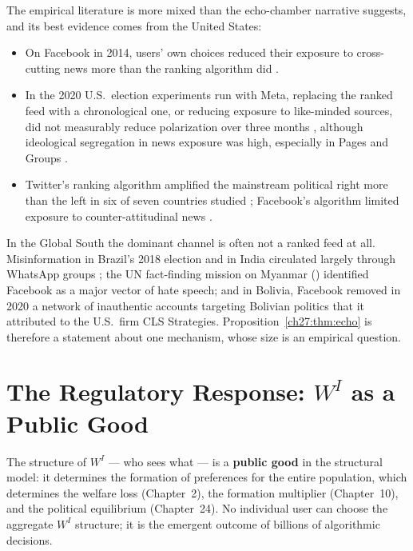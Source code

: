 \documentclass[../structural_economics_book.tex]{subfiles}
\begin{document}
The empirical literature is more mixed than the echo-chamber narrative suggests, and its best evidence comes from the United States:
\begin{itemize}
\item On Facebook in 2014, users' own choices reduced their exposure to cross-cutting news more than the ranking algorithm did \citep{bakshy2015exposure}.
\item In the 2020 U.S.\ election experiments run with Meta, replacing the ranked feed with a chronological one, or reducing exposure to like-minded sources, did not measurably reduce polarization over three months \citep{guess2023how,nyhan2023like}, although ideological segregation in news exposure was high, especially in Pages and Groups \citep{gonzalezbailon2023asymmetric}.
\item Twitter's ranking algorithm amplified the mainstream political right more than the left in six of seven countries studied \citep{huszar2022algorithmic}; Facebook's algorithm limited exposure to counter-attitudinal news \citep{levy2021social}.
\end{itemize}
In the Global South the dominant channel is often not a ranked feed at all. Misinformation in Brazil's 2018 election and in India circulated largely through WhatsApp groups \citep{machado2019study,resende2019misinformation,badrinathan2021educative}; the UN fact-finding mission on Myanmar (\citeyear{unhrc2018report}) identified Facebook as a major vector of hate speech; and in Bolivia, Facebook removed in 2020 a network of inauthentic accounts targeting Bolivian politics that it attributed to the U.S.\ firm CLS Strategies. Proposition~\ref{ch27:thm:echo} is therefore a statement about one mechanism, whose size is an empirical question.


\section{The Regulatory Response: $W^I$ as a Public Good}
\label{ch27:sec:regulation}

\begin{definition}\label{ch27:def:public_good}
The structure of $W^I$ --- who sees what --- is a \textbf{public good} in the structural model: it determines the formation of preferences for the entire population, which determines the welfare loss (Chapter~2), the formation multiplier (Chapter~10), and the political equilibrium (Chapter~24). No individual user can choose the aggregate $W^I$ structure; it is the emergent outcome of billions of algorithmic decisions.
\end{definition}
\end{document}
